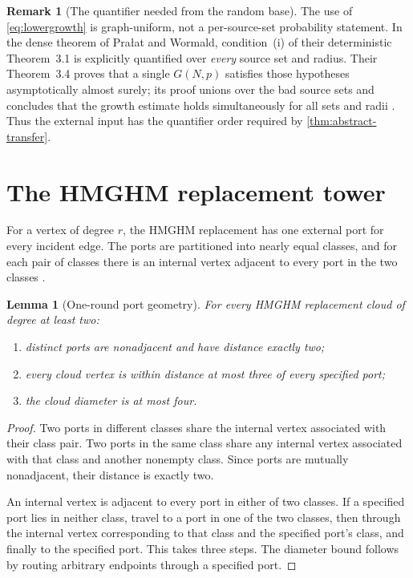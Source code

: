 \documentclass[11pt]{amsart}
\newtheorem{lemma}[theorem]{Lemma}
\theoremstyle{definition}
\newtheorem{remark}[theorem]{Remark}
\begin{document}
\begin{remark}[The quantifier needed from the random base]\label{rem:PW-uniform}
The use of \eqref{eq:lowergrowth} is graph-uniform, not a per-source-set
probability statement.  In the dense theorem of Pra{\l}at and Wormald,
condition~(i) of their deterministic Theorem~3.1 is explicitly quantified over
\emph{every} source set and radius.  Their Theorem~3.4 proves that a single
$G(N,p)$ satisfies those hypotheses asymptotically almost surely; its proof
unions over the bad source sets and concludes that the growth estimate holds
simultaneously for all sets and radii \cite[Theorems~3.1 and~3.4]{PW}.
Thus the external input has the quantifier order required by
\cref{thm:abstract-transfer}.
\end{remark}

\section{The HMGHM replacement tower}

For a vertex of degree $r$, the HMGHM replacement has one external port for
every incident edge.  The ports are partitioned into nearly equal classes,
and for each pair of classes there is an internal vertex adjacent to every
port in the two classes \cite[Section~2]{HMGHM}.

\begin{lemma}[One-round port geometry]\label{lem:portgeometry}
For every HMGHM replacement cloud of degree at least two:
\begin{enumerate}[label=\textup{(\roman*)}]
\item distinct ports are nonadjacent and have distance exactly two;
\item every cloud vertex is within distance at most three of every specified
port;
\item the cloud diameter is at most four.
\end{enumerate}
\end{lemma}

\begin{proof}
Two ports in different classes share the internal vertex associated with
their class pair.  Two ports in the same class share any internal vertex
associated with that class and another nonempty class.  Since ports are
mutually nonadjacent, their distance is exactly two.

An internal vertex is adjacent to every port in either of two classes.  If a
specified port lies in neither class, travel to a port in one of the two
classes, then through the internal vertex corresponding to that class and the
specified port's class, and finally to the specified port.  This takes three
steps.  The diameter bound follows by routing arbitrary endpoints through a
specified port.
\end{proof}
\end{document}
